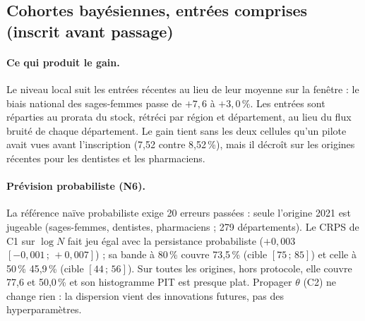 \subsection{Cohortes bayésiennes, entrées comprises (inscrit avant passage)}
\begin{table}[h]
\centering\small
{}
\caption{Périmètre privé ; valeurs mesurées\mesure. C1 bat A0 dans 17 cellules profession
$\times$ origine sur 22\mesure.}
\end{table}

\paragraph{Ce qui produit le gain.} Le niveau local suit les entrées récentes au lieu de leur moyenne
sur la fenêtre : le biais national des sages-femmes passe de $+7{,}6$ à $+3{,}0$\,\%\mesure. Les
entrées sont réparties au prorata du stock, rétréci par région et département, au lieu du flux bruité
de chaque département. Le gain tient sans les deux cellules qu'un pilote avait vues avant l'inscription
(7,52 contre 8,52\,\%\mesure), mais il décroît sur les origines récentes pour les dentistes et les
pharmaciens.

\paragraph{Prévision probabiliste (N6).} La référence naïve probabiliste exige 20 erreurs passées :
seule l'origine 2021 est jugeable (sages-femmes, dentistes, pharmaciens ; 279 départements). Le CRPS
de C1 sur $\log N$ fait jeu égal avec la persistance probabiliste ($+0{,}003$
$[-0{,}001\,;\,+0{,}007]$\mesure) ; sa bande à 80\,\% couvre 73,5\,\%\mesure{} (cible $[75\,;\,85]$)
et celle à 50\,\% 45,9\,\%\mesure{} (cible $[44\,;\,56]$). Sur toutes les origines, hors protocole,
elle couvre 77,6 et 50,0\,\%\mesure{} et son histogramme PIT est presque plat. Propager $\theta$ (C2)
ne change rien : la dispersion vient des innovations futures, pas des hyperparamètres.

